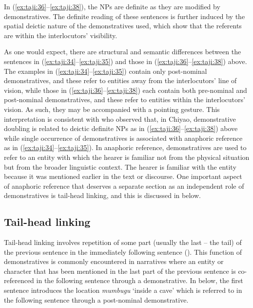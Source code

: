 \documentclass[output=paper,
            colorlinks, citecolor=brown
            ,draftmode
		  ]{langscibook}
\begin{document}
In (\ref{ex:taji:36}--\ref{ex:taji:38}), the NPs are definite as they are modified by demonstratives. The definite reading of these sentences is further induced by the spatial deictic nature of the demonstratives used, which show that the referents are within the interlocutors’ visibility. 

As one would expect, there are structural and semantic differences between the sentences in (\ref{ex:taji:34}--\ref{ex:taji:35}) and those in (\ref{ex:taji:36}--\ref{ex:taji:38}) above. The examples in (\ref{ex:taji:34}--\ref{ex:taji:35}) contain only post-nominal demonstratives, and these refer to entities away from the interlocutors’ line of vision, while those in (\ref{ex:taji:36}--\ref{ex:taji:38}) each contain both pre-nominal and post-nominal demonstratives, and these refer to entities within the interlocutors’ vision. As such, they may be accompanied with a pointing gesture. This interpretation is consistent with \citet{Taji2020} who observed that, in Chiyao, demonstrative doubling is related to deictic definite NPs as in (\ref{ex:taji:36}--\ref{ex:taji:38}) above while single occurrence of demonstratives is associated with anaphoric reference as in (\ref{ex:taji:34}--\ref{ex:taji:35}). In anaphoric reference, demonstratives are used to refer to an entity with which the hearer is familiar not from the physical situation but from the broader linguistic context. The hearer is familiar with the entity because it was mentioned earlier in the text or discourse. One important aspect of anaphoric reference that deserves a separate section as an independent role of demonstratives is tail-head linking, and this is discussed in  below.

\subsection{Tail-head linking}\label{sec:taji:6.4}

Tail-head linking involves repetition of some part (usually the last -- the tail) of the previous sentence in the immediately following sentence (\citealt[201]{vanderWal2010}). This function of demonstratives is commonly encountered in narratives where an entity or character that has been mentioned in the last part of the previous sentence is co-referenced in the following sentence through a demonstrative. In  below, the first sentence introduces the location \textit{mumbugu} ‘inside a cave’ which is referred to in the following sentence through a post-nominal demonstrative.
\end{document}
